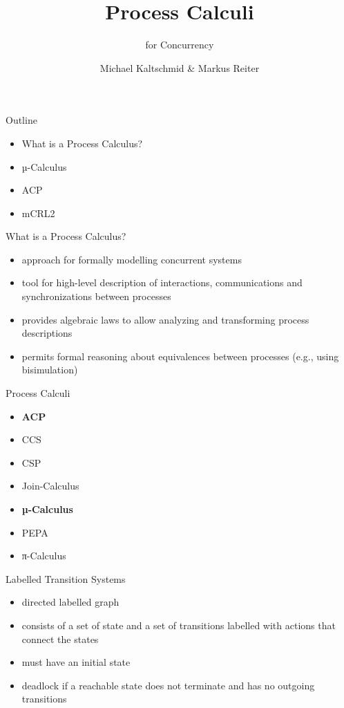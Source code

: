 \documentclass[aspectratio=1610]{beamer}
\title{Process Calculi}
\subtitle{for Concurrency}
\author{Michael Kaltschmid \& Markus Reiter}
\date{}
\begin{document}
  \maketitle

  \begin{frame}{Outline}
    \begin{itemize}
      \item What is a Process Calculus?
      \item µ-Calculus
      \item ACP
      \item mCRL2
    \end{itemize}
  \end{frame}

  \begin{frame}{What is a Process Calculus?}
    \begin{itemize}
      \item approach for formally modelling concurrent systems
      \item tool for high-level description of interactions, communications and synchronizations between processes
      \item provides algebraic laws to allow analyzing and transforming process descriptions
      \item permits formal reasoning about equivalences between processes (e.g., using bisimulation)
    \end{itemize}
  \end{frame}

  \begin{frame}{Process Calculi}
    \begin{itemize}
      \item \textbf{ACP}
      \item CCS
      \item CSP
      \item Join-Calculus
      \item \textbf{µ-Calculus}
      \item PEPA
      \item π-Calculus
    \end{itemize}
  \end{frame}

  \begin{frame}{Labelled Transition Systems}
    \begin{itemize}
      \item directed labelled graph \\
      \item consists of a set of state and a set of transitions labelled with actions that connect the states \\
      \item must have an initial state \\
      \item deadlock if a reachable state does not terminate and has no outgoing transitions \\
    \end{itemize}
  \end{frame}
\end{document}
